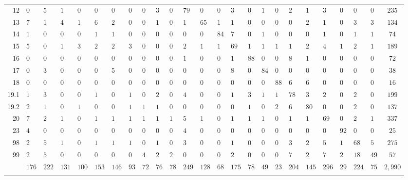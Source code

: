 \begin{table}[!htbp]
\begin{tabularx}{\textwidth}{r|XXXXXXXXXXXXXXXXXXXXXXXc}
12 & $0$ & $5$ & $1$ & $0$ & $0$ & $0$ & $0$ & $0$ & $3$ & $0$ & $79$ & $0$ & $0$ & $3$ & $0$ & $1$ & $0$ & $2$ & $1$ & $3$ & $0$ & $0$ & $0$ & $235$ \\ 
13 & $7$ & $1$ & $4$ & $1$ & $6$ & $2$ & $0$ & $0$ & $1$ & $0$ & $1$ & $65$ & $1$ & $1$ & $0$ & $0$ & $0$ & $0$ & $2$ & $1$ & $0$ & $3$ & $3$ & $134$ \\ 
14 & $1$ & $0$ & $0$ & $0$ & $1$ & $1$ & $0$ & $0$ & $0$ & $0$ & $0$ & $0$ & $84$ & $7$ & $0$ & $1$ & $0$ & $0$ & $0$ & $1$ & $0$ & $1$ & $1$ & $74$ \\ 
15 & $5$ & $0$ & $1$ & $3$ & $2$ & $2$ & $3$ & $0$ & $0$ & $0$ & $2$ & $1$ & $1$ & $69$ & $1$ & $1$ & $1$ & $1$ & $2$ & $4$ & $1$ & $2$ & $1$ & $189$ \\ 
16 & $0$ & $0$ & $0$ & $0$ & $0$ & $0$ & $0$ & $0$ & $0$ & $0$ & $1$ & $0$ & $0$ & $1$ & $88$ & $0$ & $0$ & $8$ & $1$ & $0$ & $0$ & $0$ & $0$ & $72$ \\ 
17 & $0$ & $3$ & $0$ & $0$ & $0$ & $5$ & $0$ & $0$ & $0$ & $0$ & $0$ & $0$ & $0$ & $8$ & $0$ & $84$ & $0$ & $0$ & $0$ & $0$ & $0$ & $0$ & $0$ & $38$ \\ 
18 & $0$ & $0$ & $0$ & $0$ & $0$ & $0$ & $0$ & $0$ & $0$ & $0$ & $0$ & $0$ & $0$ & $0$ & $0$ & $0$ & $88$ & $6$ & $6$ & $0$ & $0$ & $0$ & $0$ & $16$ \\ 
19.1 & $1$ & $3$ & $0$ & $0$ & $1$ & $0$ & $1$ & $0$ & $2$ & $0$ & $4$ & $0$ & $0$ & $1$ & $3$ & $1$ & $1$ & $78$ & $3$ & $2$ & $0$ & $2$ & $0$ & $199$ \\ 
19.2 & $2$ & $1$ & $0$ & $1$ & $0$ & $0$ & $1$ & $1$ & $1$ & $0$ & $0$ & $0$ & $0$ & $0$ & $1$ & $0$ & $2$ & $6$ & $80$ & $0$ & $0$ & $2$ & $0$ & $137$ \\ 
20 & $7$ & $2$ & $1$ & $0$ & $1$ & $1$ & $1$ & $1$ & $1$ & $1$ & $5$ & $1$ & $0$ & $1$ & $1$ & $1$ & $0$ & $1$ & $1$ & $69$ & $0$ & $2$ & $1$ & $337$ \\ 
23 & $4$ & $0$ & $0$ & $0$ & $0$ & $0$ & $0$ & $0$ & $0$ & $0$ & $4$ & $0$ & $0$ & $0$ & $0$ & $0$ & $0$ & $0$ & $0$ & $0$ & $92$ & $0$ & $0$ & $25$ \\ 
98 & $2$ & $5$ & $1$ & $0$ & $1$ & $1$ & $1$ & $0$ & $1$ & $0$ & $3$ & $0$ & $0$ & $1$ & $0$ & $0$ & $0$ & $3$ & $2$ & $5$ & $1$ & $68$ & $5$ & $275$ \\ 
99 & $2$ & $5$ & $0$ & $0$ & $0$ & $0$ & $0$ & $4$ & $2$ & $2$ & $0$ & $0$ & $0$ & $2$ & $0$ & $0$ & $0$ & $7$ & $2$ & $7$ & $2$ & $18$ & $49$ & $57$ \\ 
 & $176$ & $222$ & $131$ & $100$ & $153$ & $146$ & $93$ & $72$ & $76$ & $78$ & $249$ & $128$ & $68$ & $175$ & $78$ & $49$ & $23$ & $204$ & $145$ & $296$ & $29$ & $224$ & $75$ & $2,990$ \\ 
\hline \\[-1.8ex] 
\end{tabularx} 
\end{table} 
